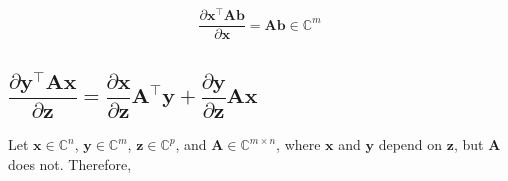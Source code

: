 \documentclass{article}
\newcommand{\trans}{\top}
\begin{document}
\begin{align}
    \boxed{\dfrac{\partial \mathbf{x}^\trans \mathbf{A} \mathbf{b}}{\partial \mathbf{x}} = \mathbf{Ab} \in \mathbb{C}^{m}}
\end{align}


\subsection{\(\dfrac{\partial \mathbf{y}^\trans \mathbf{A} \mathbf{x}}{\partial \mathbf{z}} = \dfrac{\partial \mathbf{x}}{\partial \mathbf{z}} \mathbf{A}^{\trans} \mathbf{y} + \dfrac{\partial \mathbf{y}}{\partial \mathbf{z}} \mathbf{A} \mathbf{x}\)}
Let \(\mathbf{x} \in \mathbb{C}^{n}\), \(\mathbf{y} \in \mathbb{C}^{m}\), \(\mathbf{z} \in \mathbb{C}^{p}\), and \(\mathbf{A}\in \mathbb{C}^{m\times n}\), where \(\mathbf{x}\) and \(\mathbf{y}\) depend on \(\mathbf{z}\), but \(\mathbf{A}\) does not. Therefore,
\end{document}
